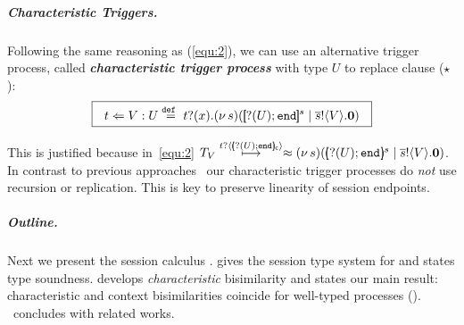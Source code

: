 \documentclass[a4paper,UKenglish]{lipics}
\theoremstyle{definition}
\begin{document}
\subparagraph{Characteristic Triggers.}
Following the same reasoning as (\ref{equ:2}), 
we can use an alternative trigger process, called
{\bf\em characteristic trigger process} with type 
$U$ to replace clause
($\star$): %
\begin{equation}
	\label{eq:4}
	\boxed{
	~~t \Leftarrow V : U \stackrel{\mathtt{def}\ }{=} t ? (x) . (\nu\, s)([\!\![? (U) ; \mathtt{end}]\!\!]^{s} \;|\; \overline{s} ! \langle V \rangle . \mathbf{0})~~
	}
\end{equation}

\noi
This is justified because in~\eqref{equ:2} $T_V \hby{\bactinp{t}{\omapchar{\btinp{U} \tinact}}} \wbc \newsp{s}{\mapchar{\btinp{U} \tinact}{s} \Par \bout{\dual{s}}{V} \inact }$.
\noi 
{}
In contrast to previous approaches~\cite{SangiorgiD:expmpa,JeffreyR05} 
our %
 characteristic trigger processes 
do {\em not} use recursion or 
replication. This is key to preserve linearity of session endpoints.  



\subparagraph{Outline.}
Next we present
the %
session calculus \HOp. 
 gives the session type system for \HOp
and states type soundness.
{} 
develops %
\emph{characteristic} bisimilarity and 
states our main result: characteristic and context bisimilarities coincide for 
well-typed \HOp processes ().
~concludes with related works. 



\end{document}
